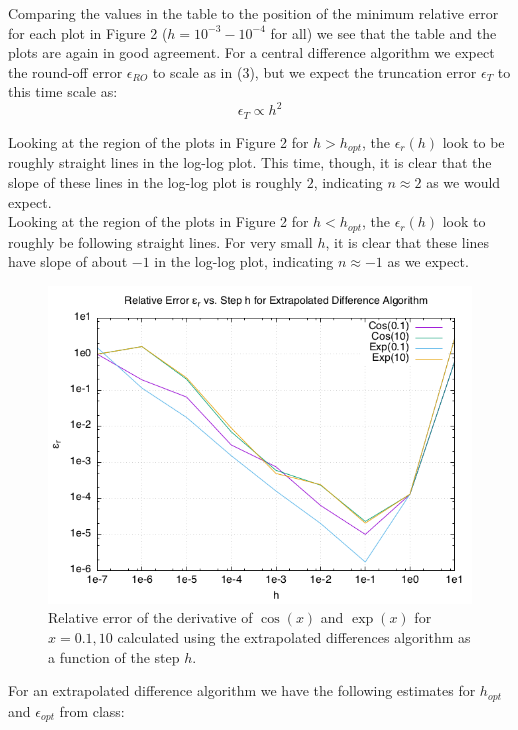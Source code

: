 \documentclass[12pt,letterpaper]{article}
\begin{document}
Comparing the values in the table to the position of the minimum relative error for each plot in Figure 2 ($h=10^{-3} - 10^{-4}$ for all) we see that the table and the plots are again in good agreement. For a central difference algorithm we expect the round-off error $\epsilon_{RO}$ to scale as in (3), but we expect the truncation error $\epsilon_{T}$ to this time scale as:
\begin{equation}
	\epsilon_{T} \propto h^{2}
\end{equation}

Looking at the region of the plots in Figure 2 for $h>h_{opt}$, the $\epsilon_{r}(h)$ look to be roughly straight lines in the log-log plot. This time, though, it is clear that the slope of these lines in the log-log plot is roughly $2$, indicating $n\approx2$ as we would expect. \\

Looking at the region of the plots in Figure 2 for $h<h_{opt}$, the $\epsilon_{r}(h)$ look to roughly be following straight lines. For very small $h$, it is clear that these lines have slope of about $-1$ in the log-log plot, indicating $n\approx-1$ as we expect.\\

\begin{figure}[H]
	\centering
	\includegraphics[scale=0.6]{extrap_diff.png}
	\caption{Relative error of the derivative of $\cos(x)$ and $\exp(x)$ for $x=0.1,10$ calculated using the extrapolated differences algorithm as a function of the step $h$.}
\end{figure}

For an extrapolated difference algorithm we have the following estimates for $h_{opt}$ and $\epsilon_{opt}$ from class:
\end{document}
